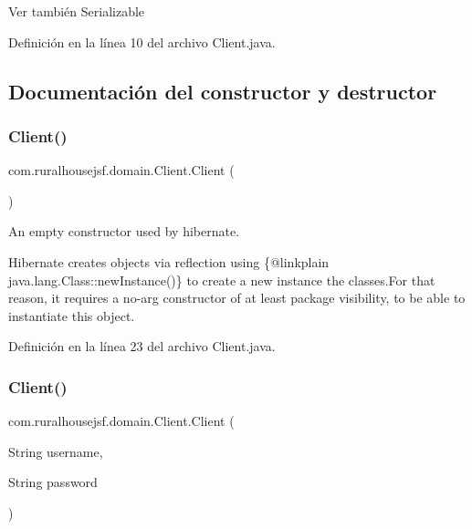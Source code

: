 \begin{DoxySeeAlso}{Ver también}
Serializable 
\end{DoxySeeAlso}


Definición en la línea 10 del archivo Client.\+java.



\subsection{Documentación del constructor y destructor}
\mbox{\label{a00164_a351f5095f2aa19b4b43bd39c069d7e43}} 
\subsubsection{\texorpdfstring{Client()}{Client()}\hspace{0.1cm}{\footnotesize\ttfamily [1/2]}}
{\footnotesize\ttfamily com.\+ruralhousejsf.\+domain.\+Client.\+Client (\begin{DoxyParamCaption}{ }\end{DoxyParamCaption})\hspace{0.3cm}{\ttfamily [package]}}



An empty constructor used by hibernate. 

Hibernate creates objects via reflection using \{@linkplain java.\+lang.\+Class\+::new\+Instance()\} to create a new instance the classes.\+For that reason, it requires a no-\/arg constructor of at least package visibility, to be able to instantiate this object. 

Definición en la línea 23 del archivo Client.\+java.

\mbox{\label{a00164_a57bf8892cfbb684bcda11d6bb786871b}} 
\subsubsection{\texorpdfstring{Client()}{Client()}\hspace{0.1cm}{\footnotesize\ttfamily [2/2]}}
{\footnotesize\ttfamily com.\+ruralhousejsf.\+domain.\+Client.\+Client (\begin{DoxyParamCaption}\item[{String}]{username,  }\item[{String}]{password }\end{DoxyParamCaption})}




